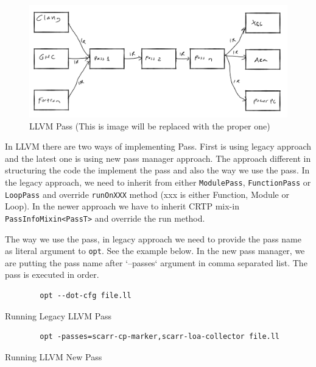 \begin{figure}[htbp] 
    \centerline{\includegraphics[scale=.25]{Figures/03/llvm.png}} 
    \caption{LLVM Pass (This is image will be replaced with the proper one)} 
    \label{fig:llvm} 
\end{figure} 

In LLVM there are two ways of implementing Pass. First is using legacy approach and the latest one is using new pass manager approach. The approach different in structuring the code the implement the pass and also the way we use the pass.  In the legacy approach, we need to inherit from either \texttt{ModulePass}, \texttt{FunctionPass} or \texttt{LoopPass} and override \texttt{runOnXXX} method (xxx is either Function, Module or Loop). In the newer approach we have to inherit CRTP mix-in \texttt{PassInfoMixin<PassT>} and override the run method.

The way we use the pass, in legacy approach we need to provide the pass name as literal argument to \texttt{opt}. See the example below. In the new pass manager, we are putting the pass name after `--passes` argument in comma separated list. The pass is executed in order.

\begin{listing}
    \begin{verbatim}
        opt --dot-cfg file.ll 
    \end{verbatim}
    \caption{Running Legacy LLVM Pass}    
    \label{listing:legacy-llvm-pass}
\end{listing}

\begin{listing}
    \begin{verbatim}
        opt -passes=scarr-cp-marker,scarr-loa-collector file.ll 
    \end{verbatim}
\caption{Running LLVM New Pass}    
\label{listing:new-llvm-pass}
\end{listing}

